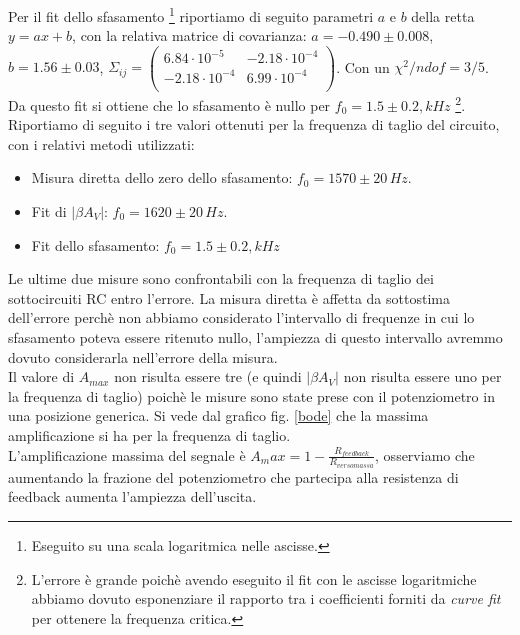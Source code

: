 \documentclass[10pt,a4paper]{article}
\begin{document}
Per il fit dello sfasamento \footnote{Eseguito su una scala logaritmica nelle ascisse.} riportiamo di seguito parametri $a$ e $b$ della retta $y=ax+b$, con la relativa matrice di covarianza: $a = -0.490 \pm 0.008$, $b = 1.56\pm 0.03$,  $ \Sigma_{ij} = \left( \begin{array}{cc}
6.84 \cdot 10^{-5} & -2.18 \cdot 10^{-4} \\ 
-2.18 \cdot 10^{-4} & 6.99 \cdot 10^{-4}\\
\end{array} \right)$. Con un $\chi^2/ndof = 3/5$.\\

Da questo fit si ottiene che lo sfasamento è nullo per $f_0 = 1.5 \pm 0.2 , kHz$ \footnote{L'errore è grande poichè avendo eseguito il fit con le ascisse logaritmiche abbiamo dovuto esponenziare il rapporto tra i coefficienti forniti da \emph{curve fit} per ottenere la frequenza critica.}.\\

Riportiamo di seguito i tre valori ottenuti per la frequenza di taglio del circuito, con i relativi metodi utilizzati:\\

\begin{itemize}
\item Misura diretta dello zero dello sfasamento: $f_0 = 1570 \pm 20 \, Hz$.
\item Fit di $\vert \beta A_V \vert$: $f_0 = 1620 \pm 20 \, Hz$.
\item Fit dello sfasamento: $f_0 = 1.5 \pm 0.2 , kHz$
\end{itemize}

Le ultime due misure sono confrontabili con la frequenza di taglio dei sottocircuiti RC entro l'errore. La misura diretta è affetta da sottostima dell'errore perchè non abbiamo considerato l'intervallo di frequenze in cui lo sfasamento poteva essere ritenuto nullo, l'ampiezza di questo intervallo avremmo dovuto considerarla nell'errore della misura.\\

Il valore di $A_{max}$ non risulta essere tre (e quindi $\vert \beta A_V \vert$ non risulta essere uno per la frequenza di taglio) poichè le misure sono state prese con il potenziometro in una posizione generica. Si vede dal grafico fig. \ref{bode} che la massima amplificazione si ha per la frequenza di taglio.\\

L'amplificazione massima del segnale è $A_max = 1 - \frac{R_{feedback}}{R_{verso massa}}$, osserviamo che aumentando la frazione del potenziometro che partecipa alla resistenza di feedback aumenta l'ampiezza dell'uscita.\\
\end{document}
